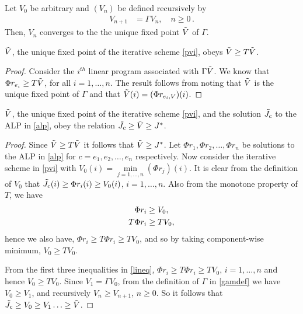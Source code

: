 \begin{corollary}
Let $V_0$ be arbitrary and $(V_n)$ be defined recursively by
\begin{align}\label{pvi}
V_{n+1}&=\Gamma V_n, \quad n\geq 0\,.
\end{align}
Then, $V_n$ converges to the the unique fixed point $\tilde{V}$ of $\Gamma$.
\end{corollary}
\begin{lemma}\label{gfp}
 $\tilde{V}$, the unique fixed point of the iterative scheme \eqref{pvi}, obeys $\tilde{V}\geq T\tilde{V}$.
\end{lemma}
\begin{proof}
Consider the $i^{th}$ linear program associated with $\Gamma \tilde{V}$. We know that $\Phi r_{e_i}\geq T \tilde{V}$, for all $i=1,\ldots, n$. The result follows from noting that $\tilde{V}$ is the unique fixed point of $\Gamma $ and that $\tilde{V}(i)=(\Phi r_{e_i,V})(i)$.
\end{proof}
\begin{lemma}\label{relation1}
 $\tilde{V}$, the unique fixed point of the iterative scheme \eqref{pvi}, and the solution $\tilde{J}_c$ to the ALP in \eqref{alp}, obey the relation $\tilde{J}_c\geq\tilde{V}\geq J^*$.
\end{lemma}
\begin{proof}
Since $\tilde{V}\geq T\tilde{V}$ it follows that $\tilde{V}\geq J^*$. Let $\Phi r_1, \Phi r_2,\ldots,\Phi r_n$ be solutions to the ALP in \eqref{alp} for $c=e_1, e_2,\ldots,e_n$ respectively. Now consider the iterative scheme in \eqref{pvi} with $V_0(i)=\underset{j=1,\ldots, n}{\min}(\Phi r_j)(i)$. It is clear from the definition of $V_0$ that $\tilde{J}_c(i)\geq\Phi r_i(i)\geq V_0(i)$, $i=1,\ldots,n$. Also from the monotone property of $T$, we have 
\begin{align}\label{lineq}
\Phi r_i&\geq V_0,\nn\\
T\Phi r_i&\geq T V_0,\nn
\end{align}
hence we also have,
$\Phi r_i\geq T\Phi r_i \geq T V_0$, 
and so by taking component-wise minimum,
$V_0 \geq T V_0$.

From the first three inequalities in \eqref{lineq}, $\Phi r_i\geq T \Phi r_i\geq T V_0$, $i=1,\dots, n$ and hence $V_0\geq TV_0$. Since $V_1=\Gamma V_0$, from the definition of $\Gamma$ in \eqref{gamdef} we have $V_0\geq V_1$, and recursively $V_{n}\geq V_{n+1}$, $n\geq 0$. So it follows that $\tilde{J}_c\geq V_0\geq V_1\ldots\geq \tilde{V}$.
\end{proof}

